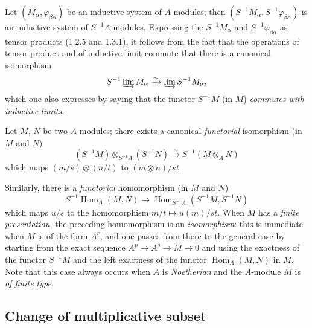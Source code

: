 \begin{env}[1.3.3]
\label{0.1.3.3}
Let $(M_\alpha,\varphi_{\beta\alpha})$ be an inductive system of $A$-modules; then $(S^{-1}M_\alpha,S^{-1}\varphi_{\beta\alpha})$ is an inductive system of $S^{-1}A$-modules.
Expressing the $S^{-1}M_\alpha$ and $S^{-1}\varphi_{\beta\alpha}$ as tensor products (1.2.5 and 1.3.1), it follows from the fact that the operations of tensor product and of inductive limit commute that there is a canonical isomorphism
\[
  S^{-1}\varinjlim M_\alpha\xrightarrow{\sim}\varinjlim S^{-1}M_\alpha,
\]
which one also expresses by saying that the functor $S^{-1}M$ (in $M$) \emph{commutes with inductive limits}.
\end{env}

\begin{env}[1.3.4]
\label{0.1.3.4}
Let $M$, $N$ be two $A$-modules; there exists a canonical \emph{functorial} isomorphism (in $M$ and $N$)
\[
  (S^{-1}M)\otimes_{S^{-1}A}(S^{-1}N)
  \xrightarrow{\sim}
  S^{-1}(M\otimes_A N)
\]
which maps $(m/s)\otimes(n/t)$ to $(m\otimes n)/st$.
\end{env}

\begin{env}[1.3.5]
\label{0.1.3.5}
Similarly, there is a \emph{functorial} homomorphism (in $M$ and $N$)
\[
  S^{-1}\operatorname{Hom}_A(M,N)
  \longrightarrow
  \operatorname{Hom}_{S^{-1}A}(S^{-1}M,S^{-1}N)
\]
which maps $u/s$ to the homomorphism $m/t\mapsto u(m)/st$.
When $M$ has a \emph{finite presentation}, the preceding homomorphism is an \emph{isomorphism}: this is immediate when $M$ is of the form $A^r$, and one passes from there to the general case by starting from the exact sequence $A^p\to A^q\to M\to 0$ and using the exactness of the functor $S^{-1}M$ and the left exactness of the functor $\operatorname{Hom}_A(M,N)$ in $M$.
Note that this case always occurs when $A$ is \emph{Noetherian} and the $A$-module $M$ is \emph{of finite type}.
\end{env}

\subsection{Change of multiplicative subset}
\label{subsection:0.1.4}

